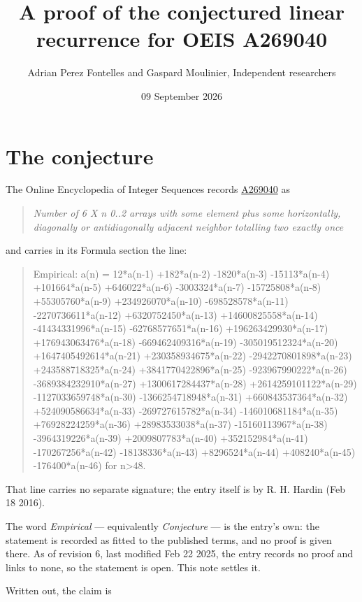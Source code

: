 \documentclass[11pt]{article}
\title{A proof of the conjectured linear recurrence for OEIS A269040}
\author{Adrian Perez Fontelles and Gaspard Moulinier, Independent researchers}
\date{09 September 2026}
\theoremstyle{definition}
\begin{document}
\maketitle
\section{The conjecture}

The Online Encyclopedia of Integer Sequences records \href{https://oeis.org/A269040}{A269040} as

\begin{quote}\itshape Number of 6 X n 0..2 arrays with some element plus some horizontally, diagonally or antidiagonally adjacent neighbor totalling two exactly once\end{quote}

and carries in its Formula section the line:

\begin{quote}\ttfamily Empirical: a(n) = 12*a(n-1) +182*a(n-2) -1820*a(n-3) -15113*a(n-4) +101664*a(n-5) +646022*a(n-6) -3003324*a(n-7) -15725808*a(n-8) +55305760*a(n-9) +234926070*a(n-10) -698528578*a(n-11) -2270736611*a(n-12) +6320752450*a(n-13) +14600825558*a(n-14) -41434331996*a(n-15) -62768577651*a(n-16) +196263429930*a(n-17) +176943063476*a(n-18) -669462409316*a(n-19) -305019512324*a(n-20) +1647405492614*a(n-21) +230358934675*a(n-22) -2942270801898*a(n-23) +243588718325*a(n-24) +3841770422896*a(n-25) -923967990222*a(n-26) -3689384232910*a(n-27) +1300617284437*a(n-28) +2614259101122*a(n-29) -1127033659748*a(n-30) -1366254718948*a(n-31) +660843537364*a(n-32) +524090586634*a(n-33) -269727615782*a(n-34) -146010681184*a(n-35) +76928224259*a(n-36) +28983533038*a(n-37) -15160113967*a(n-38) -3964319226*a(n-39) +2009807783*a(n-40) +352152984*a(n-41) -170267256*a(n-42) -18138336*a(n-43) +8296524*a(n-44) +408240*a(n-45) -176400*a(n-46) for n>48.\end{quote}

That line carries no separate signature; the entry itself is by R. H. Hardin (Feb 18 2016).

The word {\itshape Empirical} --- equivalently {\itshape Conjecture} --- is the entry's own: the statement is recorded as fitted to the published terms, and no proof is given there. As of revision 6, last modified Feb 22 2025, the entry records no proof and links to none, so the statement is open. This note settles it.

Written out, the claim is
\end{document}
